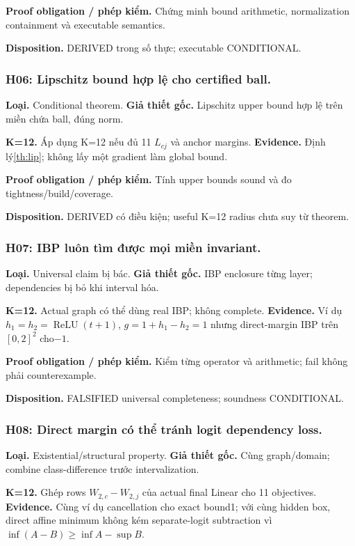 \documentclass[11pt,a4paper]{article}
\newcommand{\relu}{\operatorname{ReLU}}
\theoremstyle{remark}
\begin{document}
\textbf{Proof obligation / phép kiểm.} Chứng minh bound arithmetic, normalization containment và executable semantics.

\textbf{Disposition.} DERIVED trong số thực; executable CONDITIONAL.

\subsubsection*{H06: Lipschitz bound hợp lệ cho certified ball.}
\textbf{Loại.} Conditional theorem. \textbf{Giả thiết gốc.} Lipschitz upper bound hợp lệ trên miền chứa ball, đúng norm.

\textbf{K=12.} Áp dụng K=12 nếu đủ 11 $L_{cj}$ và anchor margins. \textbf{Evidence.} Định lý\ref{th:lip}; không lấy một gradient làm global bound.

\textbf{Proof obligation / phép kiểm.} Tính upper bounds sound và đo tightness/build/coverage.

\textbf{Disposition.} DERIVED có điều kiện; useful K=12 radius chưa suy từ theorem.

\subsubsection*{H07: IBP luôn tìm được mọi miền invariant.}
\textbf{Loại.} Universal claim bị bác. \textbf{Giả thiết gốc.} IBP enclosure từng layer; dependencies bị bỏ khi interval hóa.

\textbf{K=12.} Actual graph có thể dùng real IBP; không complete. \textbf{Evidence.} Ví dụ $h_1=h_2=\relu(t+1)$, $g=1+h_1-h_2=1$ nhưng direct-margin IBP trên$[0,2]^2$ cho$-1$.

\textbf{Proof obligation / phép kiểm.} Kiểm từng operator và arithmetic; fail không phải counterexample.

\textbf{Disposition.} FALSIFIED universal completeness; soundness CONDITIONAL.

\subsubsection*{H08: Direct margin có thể tránh logit dependency loss.}
\textbf{Loại.} Existential/structural property. \textbf{Giả thiết gốc.} Cùng graph/domain; combine class-difference trước intervalization.

\textbf{K=12.} Ghép rows $W_{2,c}-W_{2,j}$ của actual final Linear cho 11 objectives. \textbf{Evidence.} Cùng ví dụ cancellation cho exact bound1; với cùng hidden box, direct affine minimum không kém separate-logit subtraction vì $\inf(A-B)\ge\inf A-\sup B$.
\end{document}
